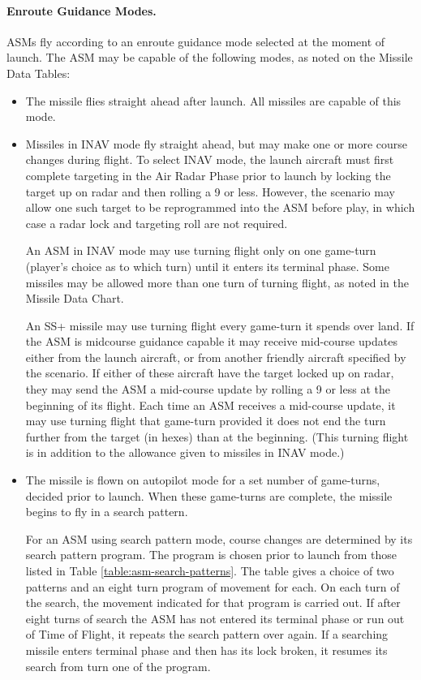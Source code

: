 \begin{advancedrules}
\paragraph{Enroute Guidance Modes.}  ASMs fly according to an enroute guidance mode selected at the moment of launch.  The ASM may be capable of the following modes, as noted on the Missile Data Tables:
\begin{itemize}

    \item {} The missile flies straight ahead after launch.  All missiles are capable of this mode. 

    \item {} Missiles in INAV mode fly straight ahead, but may make one or more course changes during flight. To select INAV mode, the launch aircraft must first complete targeting in the Air Radar Phase prior to launch by locking the target up on radar and then rolling a 9 or less. However, the scenario may allow one such target to be reprogrammed into the ASM before play, in which case a radar lock and targeting roll are not required.

    An ASM in INAV mode may use turning flight only on one game-turn (player's choice as to which turn) until it enters its terminal phase. Some missiles may be allowed more than one turn of turning flight, as noted in the Missile Data Chart.   

    An SS+ missile may use turning flight every game-turn it spends over land.  If the ASM is midcourse guidance capable it may receive mid-course updates either from the launch aircraft, or from another friendly aircraft specified by the scenario.  If either of these aircraft have the target locked up on radar, they may send the ASM a mid-course update by rolling a 9 or less at the beginning of its flight.  Each time an ASM receives a mid-course update, it may use turning flight that game-turn provided it does not end the turn further from the target (in hexes) than at the beginning. (This turning flight is in addition to the allowance given to missiles in INAV mode.)

    \item {}  The missile is flown on autopilot mode for a set number of game-turns, decided prior to launch.  When these game-turns are complete, the missile begins to fly in a search pattern.

    For an ASM using search pattern mode, course changes are determined by its search pattern program.  The program is chosen prior to launch from those listed in Table \ref{table:asm-search-patterns}. The table gives a choice of two patterns and an eight turn program of movement for each. On each turn of the search, the movement indicated for that program is carried out.  If after eight turns of search the ASM has not entered its terminal phase or run out of Time of Flight, it repeats the search pattern over again.  If a searching missile enters terminal phase and then has its lock broken, it resumes its search from turn one of the program.


\end{itemize}
\end{advancedrules}
